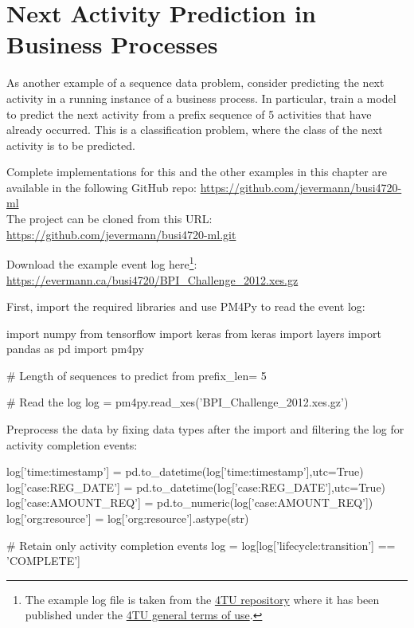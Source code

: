 \section{Next Activity Prediction in Business Processes}

As another example of a sequence data problem, consider predicting the next activity in a running instance of a business process. In particular, train a model to predict the next activity from a prefix sequence of 5 activities that have already occurred. This is a classification problem, where the class of the next activity is to be predicted. 

\begin{tcolorbox}[colback=code]
\footnotesize
Complete implementations for this and the other examples in this chapter are available in the following GitHub repo: \url{https://github.com/jevermann/busi4720-ml} \\

The project can be cloned from this URL: \url{https://github.com/jevermann/busi4720-ml.git}

Download the example event log here\footnote{
The example log file is taken from the \href{
https://doi.org/10.4121/uuid:3926db30-f712-4394-aebc-75976070e91f}{4TU repository} where it has been published under the \href{ https://data.4tu.nl/articles/_/12721292/1}{4TU general terms of use}.
}: \url{https://evermann.ca/busi4720/BPI_Challenge_2012.xes.gz}
\normalsize
\end{tcolorbox}

First, import the required libraries and use PM4Py to read the event log:

\begin{samepage}
\begin{pythoncode}
import numpy
from tensorflow import keras
from keras import layers
import pandas as pd
import pm4py

# Length of sequences to predict from
prefix_len= 5   

# Read the log
log = pm4py.read_xes('BPI_Challenge_2012.xes.gz')  
\end{pythoncode}
\end{samepage}

Preprocess the data by fixing data types after the import and filtering the log for activity completion events:

\begin{samepage}
\begin{pythoncode}
log['time:timestamp'] = pd.to_datetime(log['time:timestamp'],utc=True)
log['case:REG_DATE'] = pd.to_datetime(log['case:REG_DATE'],utc=True)
log['case:AMOUNT_REQ'] = pd.to_numeric(log['case:AMOUNT_REQ'])
log['org:resource'] = log['org:resource'].astype(str)

# Retain only activity completion events
log = log[log['lifecycle:transition'] == 'COMPLETE']
\end{pythoncode}
\end{samepage}

